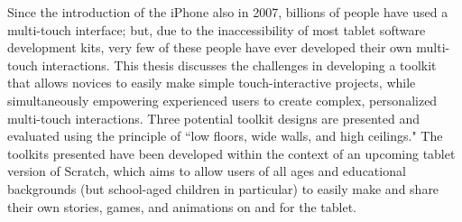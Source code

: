 % 
% 
%

Since the introduction of the iPhone also in 2007, billions of people have used a multi-touch interface; but, due to the inaccessibility of most tablet software development kits, very few of these people have ever developed their own multi-touch interactions. This thesis discusses the challenges in developing a toolkit that allows novices to easily make simple touch-interactive projects, while simultaneously empowering experienced users to create complex, personalized multi-touch interactions. Three potential toolkit designs are presented and evaluated using the principle of ``low floors, wide walls, and high ceilings." The toolkits presented have been developed within the context of an upcoming tablet version of Scratch, which aims to allow users of all ages and educational backgrounds (but school-aged children in particular) to easily make and share their own stories, games, and animations on and for the tablet.